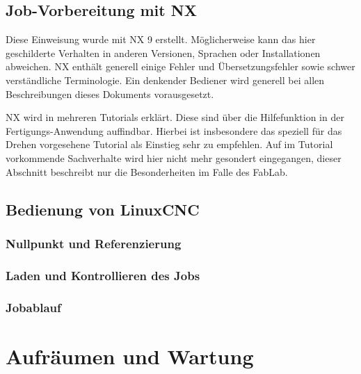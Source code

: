 \documentclass{\basedir/fablab-document}
\begin{document}
\subsection{Job-Vorbereitung mit NX}
Diese Einweisung wurde mit NX 9 erstellt. Möglicherweise kann das hier geschilderte Verhalten in anderen Versionen, Sprachen oder Installationen abweichen. NX enthält generell einige Fehler und Übersetzungsfehler sowie schwer verständliche Terminologie. Ein denkender Bediener wird generell bei allen Beschreibungen dieses Dokuments vorausgesetzt.

NX wird in mehreren Tutorials erklärt. Diese sind über die Hilfefunktion in der Fertigungs-Anwendung auffindbar. Hierbei ist insbesondere das speziell für das Drehen vorgesehene Tutorial als Einstieg sehr zu empfehlen. Auf im Tutorial vorkommende Sachverhalte wird hier nicht mehr gesondert eingegangen, dieser Abschnitt beschreibt nur die Besonderheiten im Falle des FabLab.



\subsection{Bedienung von LinuxCNC}
\subsubsection{Nullpunkt und Referenzierung}
\subsubsection{Laden und Kontrollieren des Jobs}
\subsubsection{Jobablauf}

\newpage
\section{Aufräumen und Wartung}
\end{document}
